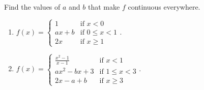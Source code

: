 Find the values of $a$ and $b$ that make $f$ continuous everywhere.
\begin{enumerate}[ref={\fcProblemRef}]
\item 
$\displaystyle
f(x)= \left\{\begin{array}{ll}
\displaystyle 1 & {\text{if~}x<0}\\ 
\displaystyle {ax+b}& {\text{if~}0\leq x<1}\\ 
{2x}& \text{if~}{x\geq 1}\end{array}\right. .
$
\item
$\displaystyle
f(x)= \left\{\begin{array}{ll}
\displaystyle {\frac{x^2-1}{x-1}} & {\text{if~}x<1}\\ 
\displaystyle {ax^2-bx+3}& {\text{if~}1\leq x<3}\\ 
{2x-a+b}& \text{if~}{x\geq 3}\end{array}\right. .
$

\end{enumerate}
